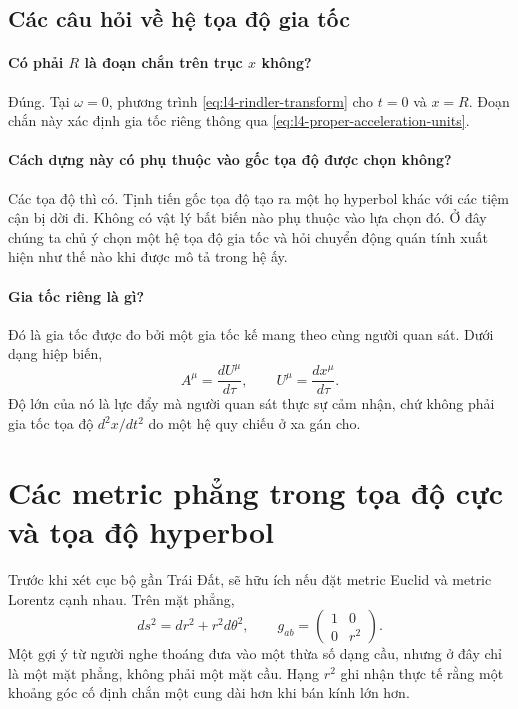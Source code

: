 \subsection{Các câu hỏi về hệ tọa độ gia tốc}

\paragraph{Có phải \(R\) là đoạn chắn trên trục \(x\) không?}
Đúng. Tại \(\omega=0\), phương trình \eqref{eq:l4-rindler-transform} cho \(t=0\) và \(x=R\). Đoạn chắn này xác định gia tốc riêng thông qua \eqref{eq:l4-proper-acceleration-units}.

\paragraph{Cách dựng này có phụ thuộc vào gốc tọa độ được chọn không?}
Các tọa độ thì có. Tịnh tiến gốc tọa độ tạo ra một họ hyperbol khác với các tiệm cận bị dời đi. Không có vật lý bất biến nào phụ thuộc vào lựa chọn đó. Ở đây chúng ta chủ ý chọn một hệ tọa độ gia tốc và hỏi chuyển động quán tính xuất hiện như thế nào khi được mô tả trong hệ ấy.

\paragraph{Gia tốc riêng là gì?}
Đó là gia tốc được đo bởi một gia tốc kế mang theo cùng người quan sát. Dưới dạng hiệp biến,
\begin{equation}
A^\mu=\frac{dU^\mu}{d\tau},
\qquad
U^\mu=\frac{dx^\mu}{d\tau}.
\end{equation}
Độ lớn của nó là lực đẩy mà người quan sát thực sự cảm nhận, chứ không phải gia tốc tọa độ \(d^2x/dt^2\) do một hệ quy chiếu ở xa gán cho.

\section{Các metric phẳng trong tọa độ cực và tọa độ hyperbol}

Trước khi xét cục bộ gần Trái Đất, sẽ hữu ích nếu đặt metric Euclid và metric Lorentz cạnh nhau. Trên mặt phẳng,
\begin{equation}
ds^2=dr^2+r^2d\theta^2,
\qquad
g_{ab}
=
\begin{pmatrix}
1&0\\
0&r^2
\end{pmatrix}.
\label{eq:l4-polar-metric}
\end{equation}
Một gợi ý từ người nghe thoáng đưa vào một thừa số dạng cầu, nhưng ở đây chỉ là một mặt phẳng, không phải một mặt cầu. Hạng \(r^2\) ghi nhận thực tế rằng một khoảng góc cố định chắn một cung dài hơn khi bán kính lớn hơn.

